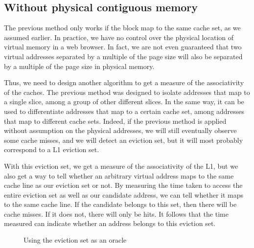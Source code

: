 \documentclass[a4paper,11pt,oneside]{report}
\begin{document}
\subsection{Without physical contiguous memory}
\label{sec:cache_associativity_no_contig}

The previous method only works if the block map to the same cache set, as we assumed earlier. In practice, we have no control over the physical location of virtual memory in a web browser. In fact, we are not even guaranteed that two virtual addresses separated by a multiple of the page size will also be separated by a multiple of the page size in physical memory.

Thus, we need to design another algorithm to get a measure of the associativity of the caches. The previous method was designed to isolate addresses that map to a single slice, among a group of other different slices. In the same way, it can be used to differentiate addresses that map to a certain cache set, among addresses that map to different cache sets. Indeed, if the previous method is applied without assumption on the physical addresses, we will still eventually observe some cache misses, and we will detect an eviction set, but it will most probably correspond to a L1 eviction set. 

With this eviction set, we get a measure of the associativity of the L1, but we also get a way to tell whether an arbitrary virtual address maps to the same cache line as our eviction set or not. By measuring the time taken to access the entire eviction set as well as our candidate address, we can tell whether it maps to the same cache line. If the candidate belongs to this set, then there will be cache misses. If it does not, there will only be hits. It follows that the time measured can indicate whether an address belongs to this eviction set.

\begin{figure}
    \centering
    \caption{Using the eviction set as an oracle}
    \label{fig:eviction_oracle}
\end{figure}
\end{document}
